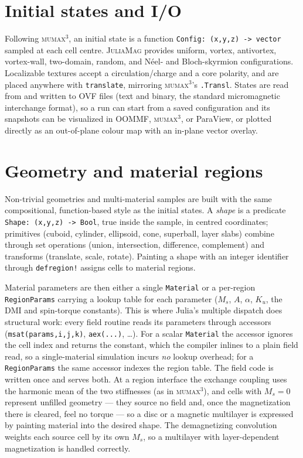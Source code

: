 \documentclass{article}      %
\newcommand{\JuliaMag}{\textsc{JuliaMag}}
\newcommand{\mumax}{\textsc{mumax}$^3$}
\begin{document}
\section{Initial states and I/O}
\label{sec:config}

Following \mumax{}, an initial state is a function \texttt{Config: (x,y,z) ->
vector} sampled at each cell centre. \JuliaMag{} provides uniform, vortex,
antivortex, vortex-wall, two-domain, random, and N\'eel- and Bloch-skyrmion
configurations. Localizable textures accept a circulation/charge and a core
polarity, and are placed anywhere with \texttt{translate}, mirroring \mumax's
\texttt{.Transl}. States are read from and written to OVF files (text and binary,
the standard micromagnetic interchange format), so a run can start from a saved
configuration and its snapshots can be visualized in OOMMF, \mumax, or ParaView,
or plotted directly as an out-of-plane colour map with an in-plane vector
overlay.

\section{Geometry and material regions}
\label{sec:regions}

Non-trivial geometries and multi-material samples are built with the same
compositional, function-based style as the initial states. A \emph{shape} is a
predicate \texttt{Shape: (x,y,z) -> Bool}, true inside the sample, in centred
coordinates; primitives (cuboid, cylinder, ellipsoid, cone, superball, layer
slabs) combine through set operations (union, intersection, difference,
complement) and transforms (translate, scale, rotate). Painting a shape with an
integer identifier through \texttt{defregion!} assigns cells to material regions.

Material parameters are then either a single \texttt{Material} or a per-region
\texttt{RegionParams} carrying a lookup table for each parameter
($M_s$, $A$, $\alpha$, $K_u$, the DMI and spin-torque constants). This is where
Julia's multiple dispatch does structural work: every field routine reads its
parameters through accessors (\texttt{msat(params,i,j,k)}, \texttt{aex(...)},
\ldots). For a scalar \texttt{Material} the accessor ignores the cell index and
returns the constant, which the compiler inlines to a plain field read, so a
single-material simulation incurs \emph{no} lookup overhead; for a
\texttt{RegionParams} the same accessor indexes the region table. The field code
is written once and serves both. At a region interface the exchange coupling uses
the harmonic mean of the two stiffnesses (as in \mumax), and cells with
$M_s = 0$ represent unfilled geometry --- they source no field and, once the
magnetization there is cleared, feel no torque --- so a disc or a magnetic
multilayer is expressed by painting material into the desired shape. The
demagnetizing convolution weights each source cell by its own $M_s$, so a
multilayer with layer-dependent magnetization is handled correctly.
\end{document}
